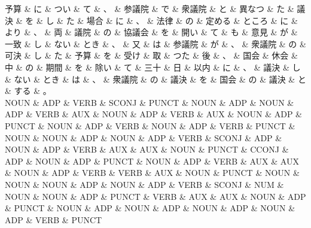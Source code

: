 \documentclass[tikz,border=5pt]{standalone}
\begin{document}
\fontsize{5pt}{6pt}\selectfont
\begin{dependency}[edge unit distance=3.0pt]
    \begin{deptext}[column sep=0.3em]
        予算 \& に \& つい \& て \& 、 \& 参議院 \& で \& 衆議院 \& と \& 異なつ \& た \& 議決 \& を \& し \& た \& 場合 \& に \& 、 \& 法律 \& の \& 定める \& ところ \& に \& より \& 、 \& 両 \& 議院 \& の \& 協議会 \& を \& 開い \& て \& も \& 意見 \& が \& 一致 \& し \& ない \& とき \& 、 \& 又 \& は \& 参議院 \& が \& 、 \& 衆議院 \& の \& 可決 \& し \& た \& 予算 \& を \& 受け \& 取 \& つた \& 後 \& 、 \& 国会 \& 休会 \& 中 \& の \& 期間 \& を \& 除い \& て \& 三十 \& 日 \& 以内 \& に \& 、 \& 議決 \& し \& ない \& とき \& は \& 、 \& 衆議院 \& の \& 議決 \& を \& 国会 \& の \& 議決 \& と \& する \& 。\\
        NOUN \& ADP \& VERB \& SCONJ \& PUNCT \& NOUN \& ADP \& NOUN \& ADP \& VERB \& AUX \& NOUN \& ADP \& VERB \& AUX \& NOUN \& ADP \& PUNCT \& NOUN \& ADP \& VERB \& NOUN \& ADP \& VERB \& PUNCT \& NOUN \& NOUN \& ADP \& NOUN \& ADP \& VERB \& SCONJ \& ADP \& NOUN \& ADP \& VERB \& AUX \& AUX \& NOUN \& PUNCT \& CCONJ \& ADP \& NOUN \& ADP \& PUNCT \& NOUN \& ADP \& VERB \& AUX \& AUX \& NOUN \& ADP \& VERB \& VERB \& AUX \& NOUN \& PUNCT \& NOUN \& NOUN \& NOUN \& ADP \& NOUN \& ADP \& VERB \& SCONJ \& NUM \& NOUN \& NOUN \& ADP \& PUNCT \& VERB \& AUX \& AUX \& NOUN \& ADP \& PUNCT \& NOUN \& ADP \& NOUN \& ADP \& NOUN \& ADP \& NOUN \& ADP \& VERB \& PUNCT\\
    \end{deptext}

\end{dependency}
\end{document}
